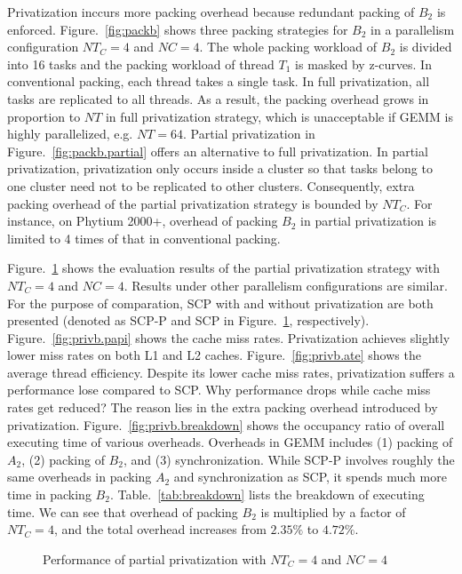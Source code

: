 Privatization inccurs more packing overhead because
redundant packing of $B_2$ is enforced.
Figure.~\ref{fig:packb} shows three packing strategies for $B_2$
in a parallelism configuration $NT_C=4$ and $NC=4$.
The whole packing workload of $B_2$ is divided into 16 tasks
and the packing workload of thread $T_1$ is masked by z-curves. 
In conventional packing, each thread takes a single task.
In full privatization, all tasks are replicated to all threads.
As a result, the packing overhead grows in proportion to $NT$
in full privatization strategy, which is unacceptable
if GEMM is highly parallelized, e.g. $NT=64$.
Partial privatization in Figure.~\ref{fig:packb.partial}
offers an alternative to full privatization.
In partial privatization, privatization only occurs inside
a cluster so that tasks belong to one cluster need not to be
replicated to other clusters.
Consequently, extra packing overhead of the partial privatization
strategy is bounded by $NT_C$.
For instance, on Phytium 2000+, overhead of packing $B_2$
in partial privatization is limited to 4 times
of that in conventional packing.

Figure.~\ref{fig:privb} shows the evaluation results of the partial
privatization strategy with $NT_C=4$ and $NC=4$.
Results under other parallelism configurations are similar.
For the purpose of comparation,
SCP with and without privatization are both presented
(denoted as SCP-P and SCP in Figure.~\ref{fig:privb}, respectively).
Figure.~\ref{fig:privb.papi} shows the cache miss rates.
Privatization achieves slightly lower miss rates on both L1 and L2 caches.
Figure.~\ref{fig:privb.ate} shows the average thread efficiency.
Despite its lower cache miss rates,
privatization suffers a performance lose compared to SCP.
Why performance drops while cache miss rates get reduced?
The reason lies in the extra packing overhead introduced by privatization.
Figure.~\ref{fig:privb.breakdown} shows the occupancy ratio
of overall executing time of various overheads.
Overheads in GEMM includes
(1) packing of $A_2$, (2) packing of $B_2$,
and (3) synchronization.
While SCP-P involves roughly the same overheads in
packing $A_2$ and synchronization as SCP,
it spends much more time in packing $B_2$.
Table.~\ref{tab:breakdown} lists the breakdown of
executing time. We can see that overhead of packing $B_2$
is multiplied by a factor of $NT_C=4$,
and the total overhead increases from $2.35\%$ to $4.72\%$.

\begin{figure}
  \centering
  \caption{Performance of partial privatization with $NT_C=4$ and $NC=4$}
  \label{fig:privb}
\end{figure}


